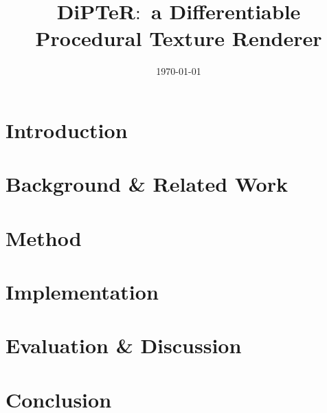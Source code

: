 \documentclass[nofilelist]{template/cslthse-msc}
\title{DiPTeR$:$ a Differentiable Procedural Texture Renderer}
\date{\today}
\begin{document}
\renewcommand{\bibname}{References}

\makefrontmatter
\chapter{Introduction}


\chapter{Background \& Related Work}


\chapter{Method}


\chapter{Implementation}


\chapter{Evaluation \& Discussion}


\chapter{Conclusion}

 
{}

\begin{appendices}


\checkoddpage
\ifoddpage
\else
   \newpage
   \thispagestyle{empty}
   \mbox{ }
\fi


\end{appendices}
\end{document}
